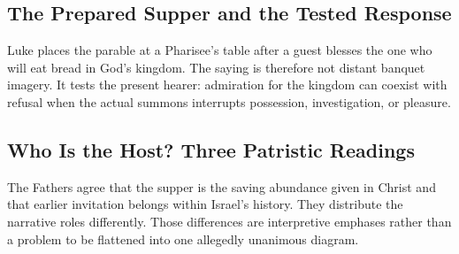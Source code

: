 \begin{deepstudy}
\subsection*{The Prepared Supper and the Tested Response\enspace{}}

Luke places the parable at a Pharisee's table after a guest blesses the one who will eat bread in God's kingdom. The saying is therefore not distant banquet imagery. It tests the present hearer: admiration for the kingdom can coexist with refusal when the actual summons interrupts possession, investigation, or pleasure.

\sectionguard
\subsection*{Who Is the Host? Three Patristic Readings\enspace{}}

The Fathers agree that the supper is the saving abundance given in Christ and that earlier invitation belongs within Israel's history. They distribute the narrative roles differently. Those differences are interpretive emphases rather than a problem to be flattened into one allegedly unanimous diagram.


\end{deepstudy}

